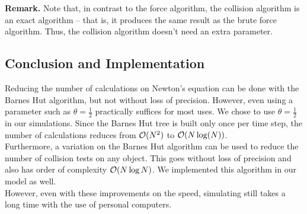 \textbf{Remark.} Note that, in contrast to the force algorithm, the collision algorithm is an exact algorithm -- that is, it produces the same result as the brute force algorithm. Thus, the collision algorithm doesn't need an extra parameter.
\subsection{Conclusion and Implementation}
Reducing the number of calculations on Newton's equation can be done with the Barnes Hut algorithm, but not without loss of precision. However, even using a parameter such as $\theta=\frac{1}{2}$ practically suffices for most uses. We chose to use $\theta = \frac{1}{2}$ in our simulations. Since the Barnes Hut tree is built only once per time step, the number of calculations reduces from $\mathcal{O}(N^2)$ to $\mathcal{O}(N\log(N))$.\\
Furthermore, a variation on the Barnes Hut algorithm can be used to reduce the number of collision tests on any object. This goes without loss of precision and also has order of complexity $\mathcal{O}(N\log N)$. We implemented this algorithm in our model as well.\\
However, even with these improvements on the speed, simulating still takes a long time with the use of personal computers.

